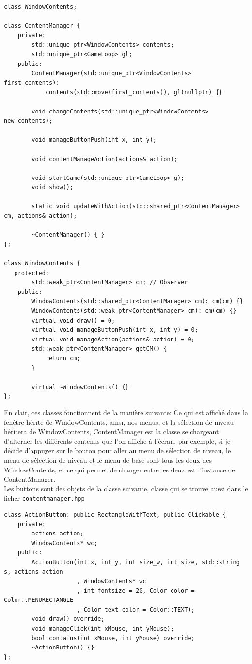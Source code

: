 \documentclass[a4paper, 12pt]{article}
\begin{document}
\begin{lstlisting}
class WindowContents;

class ContentManager {
    private:
        std::unique_ptr<WindowContents> contents;
        std::unique_ptr<GameLoop> gl;
    public:
        ContentManager(std::unique_ptr<WindowContents> first_contents):
            contents(std::move(first_contents)), gl(nullptr) {}

        void changeContents(std::unique_ptr<WindowContents> new_contents);

        void manageButtonPush(int x, int y);

        void contentManageAction(actions& action);

        void startGame(std::unique_ptr<GameLoop> g);
        void show();

        static void updateWithAction(std::shared_ptr<ContentManager> cm, actions& action);

        ~ContentManager() { }
};

class WindowContents {
   protected:
        std::weak_ptr<ContentManager> cm; // Observer
    public:
        WindowContents(std::shared_ptr<ContentManager> cm): cm(cm) {}
        WindowContents(std::weak_ptr<ContentManager> cm): cm(cm) {}
        virtual void draw() = 0;
        virtual void manageButtonPush(int x, int y) = 0;
        virtual void manageAction(actions& action) = 0;
        std::weak_ptr<ContentManager> getCM() {
            return cm;
        }

        virtual ~WindowContents() {}
};
\end{lstlisting}
En clair, ces classes fonctionnent de la manière suivante:
Ce qui est affiché dans la fenêtre hérite de WindowContents, 
ainsi, nos menus, et la sélection de niveau héritera de WindowContents, 
ContentManager est la classe se chargeant d'alterner les différents contenus 
que l'on affiche à l'écran,
par exemple, si je décide d'appuyer sur le bouton pour aller au menu de sélection de niveau,
le menu de sélection de niveau et le menu de base sont tous les deux des WindowContents,
et ce qui permet de changer entre les deux est l'instance de ContentManager. \\

Les buttons sont des objets de la classe suivante, 
classe qui se trouve aussi dans le ficher \texttt{content\textunderscore manager.hpp}
\begin{lstlisting}
class ActionButton: public RectangleWithText, public Clickable {
    private:
        actions action;
        WindowContents* wc;
    public:
        ActionButton(int x, int y, int size_w, int size, std::string s, actions action
                     , WindowContents* wc
                     , int fontsize = 20, Color color = Color::MENURECTANGLE
                     , Color text_color = Color::TEXT);
        void draw() override;
        void manageClick(int xMouse, int yMouse);
        bool contains(int xMouse, int yMouse) override;
        ~ActionButton() {}
};
\end{lstlisting}
\end{document}
